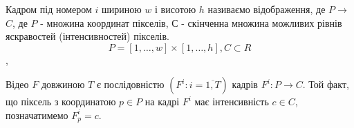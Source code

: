 Кадром під номером $i$ шириною $w$ і висотою $h$ називаємо відображення, де 
$P$$\to$$C$, де $P$ - множина координат пікселів, $С$ - скінченна множина можливих рівнів
яскравостей (інтенсивностей) пікселів.
\begin{equation}
    P = [1, \ldots ,w]\times[1, \ldots, h], C \subset R
\end{equation},

Відео \(F\) довжиною \(T\)
є послідовністю \(\left( F^{i}:i = \overline{1,T} \right)\) кадрів
\(F^{i}:P \rightarrow C\). Той факт, що піксель з координатою
\(p \in P\) на кадрі \(F^{i}\) має інтенсивність \(c \in C\),
позначатимемо \(F_{p}^{i} = c\).

\clearpage